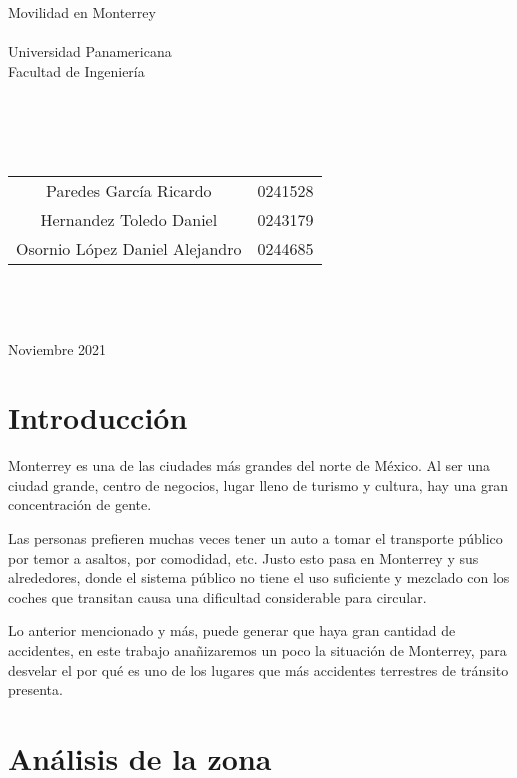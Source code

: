 \documentclass[a4paper]{article}
\begin{document}
\hspace{0pt}
\vfill

\begin{center}
    {\huge Movilidad en Monterrey}\\    \quad\\
    {\large Universidad Panamericana}\\
    {\large Facultad de Ingeniería}\\
    \quad\\
    \quad\\

    \quad\\
    \quad\\
    \begin{tabular}{c|c}
        Paredes García Ricardo & 0241528\\
        Hernandez Toledo Daniel& 0243179\\
        Osornio López Daniel Alejandro & 0244685\\
    \end{tabular}\\
    \quad\\
    \quad\\
    Noviembre 2021\\
\end{center}

\vfill
\newpage


\section{Introducción}
Monterrey es una de las ciudades más grandes del norte de México. Al ser una ciudad grande, centro de negocios, lugar lleno de turismo y cultura, hay una gran concentración de gente.

Las personas prefieren muchas veces tener un auto a tomar el transporte público por temor a asaltos, por comodidad, etc. Justo esto pasa en Monterrey y sus alrededores, donde el sistema público no tiene el uso suficiente y mezclado con los coches que transitan causa una dificultad considerable para circular.

Lo anterior mencionado y más, puede generar que haya gran cantidad de accidentes, en este trabajo anañizaremos un poco la situación de Monterrey, para desvelar el por qué es uno de los lugares que más accidentes terrestres de tránsito presenta.
 
\section{Análisis de la zona}
\end{document}

